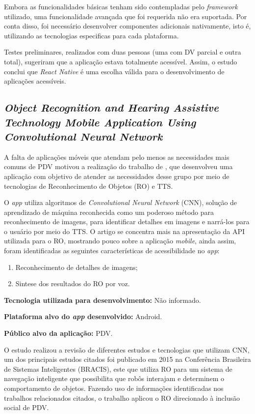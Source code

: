 Embora as funcionalidades básicas tenham sido contempladas pelo \emph{framework} utilizado, uma funcionalidade avançada que foi requerida não era suportada.
Por conta disso, foi necessário desenvolver componentes adicionais nativamente, isto é, utilizando as tecnologias especificas para cada plataforma.

Testes preliminares, realizados com duas pessoas (uma com DV parcial e outra total), sugeriram que a aplicação estava totalmente acessível.
Assim, o estudo conclui que \emph{React Native} é uma escolha válida para o desenvolvimento de aplicações acessíveis.

\subsection{\emph{Object Recognition and Hearing Assistive Technology Mobile Application Using Convolutional Neural Network}}

A falta de aplicações móveis que atendam pelo menos as necessidades mais comuns de PDV motivou a realização do trabalho de , que desenvolveu
uma aplicação com objetivo de atender as necessidades desse grupo por meio de tecnologias de Reconhecimento de Objetos (RO) e TTS\@.

O \emph{app} utiliza algoritmos de \emph{Convolutional Neural Network} (CNN), solução de aprendizado de máquina reconhecida como um poderoso método para reconhecimento de
imagens, para identificar detalhes em imagens e narrá\@-los para o usuário por meio do TTS\@. O artigo se concentra mais na apresentação da API utilizada para o RO, mostrando
pouco sobre a aplicação \emph{mobile}, ainda assim, foram identificadas as seguintes características de acessibilidade no \emph{app}:

\begin{enumerate}
    \item Reconhecimento de detalhes de imagens;
    \item Sintese dos resultados do RO por voz.
\end{enumerate}

\textbf{Tecnologia utilizada para desenvolvimento:} Não informado.

\textbf{Plataforma alvo do \emph{app} desenvolvido:} Android.

\textbf{Público alvo da aplicação:} PDV\@.

O estudo realizou a revisão de diferentes estudos e tecnologias que utilizam CNN, um dos principais estudos citados
foi publicado em 2015 na Conferência Brasileira de Sistemas Inteligentes (BRACIS), este que utiliza RO para um sistema
de navegação inteligente que possibilita que robôs interajam e determinem o comportamento de objetos.
Fazendo uso de informações identificadas nos trabalhos relacionados citados, o trabalho aplicou o RO direcionado à inclusão social de PDV\@.

